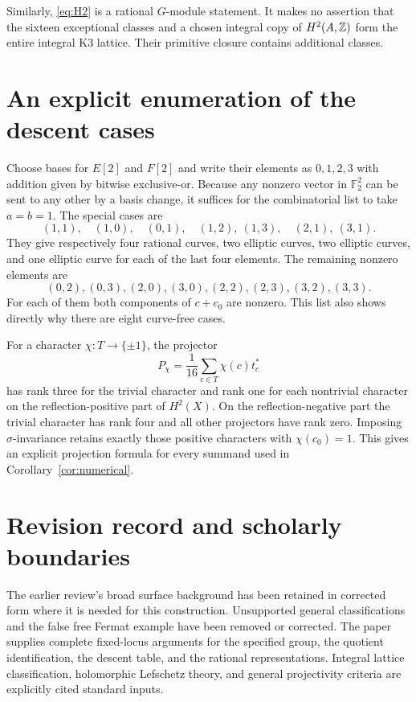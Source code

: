 \documentclass[11pt]{amsart}
\theoremstyle{definition}
\newcommand{\F}{\mathbb F}\newcommand{\Km}{\operatorname{Km}}
\begin{document}
Similarly, \eqref{eq:H2} is a rational $G$-module statement. It makes
no assertion that the sixteen exceptional classes and a chosen
integral copy of $H^2(A,\mathbb Z)$ form the entire integral K3 lattice.
Their primitive closure contains additional classes.

\section{An explicit enumeration of the descent cases}
Choose bases for $E[2]$ and $F[2]$ and write their elements as
$0,1,2,3$ with addition given by bitwise exclusive-or. Because any
nonzero vector in $\F_2^2$ can be sent to any other by a basis
change, it suffices for the combinatorial list to take $a=b=1$.
The special cases are
\[
 (1,1),\quad(1,0),\quad(0,1),\quad(1,2),\ (1,3),\quad
 (2,1),\ (3,1).
\]
They give respectively four rational curves, two elliptic curves,
two elliptic curves, and one elliptic curve for each of the last
four elements. The remaining nonzero elements are
\[
 (0,2),(0,3),(2,0),(3,0),(2,2),(2,3),(3,2),(3,3).
\]
For each of them both components of $c+c_0$ are nonzero. This list
also shows directly why there are eight curve-free cases.

For a character $\chi:T\to\{\pm1\}$, the projector
\[
 P_\chi=\frac1{16}\sum_{c\in T}\chi(c)t_c^*
\]
has rank three for the trivial character and rank one for each
nontrivial character on the reflection-positive part of $H^2(X)$.
On the reflection-negative part the trivial character has rank four
and all other projectors have rank zero. Imposing $\sigma$-invariance
retains exactly those positive characters with $\chi(c_0)=1$.
This gives an explicit projection formula for every summand used
in Corollary~\ref{cor:numerical}.

\section{Revision record and scholarly boundaries}
The earlier review's broad surface background has been retained in
corrected form where it is needed for this construction. Unsupported
general classifications and the false free Fermat example have been
removed or corrected. The paper supplies complete fixed-locus
arguments for the specified group, the quotient identification, the
descent table, and the rational representations. Integral lattice
classification, holomorphic Lefschetz theory, and general projectivity
criteria are explicitly cited standard inputs.
\end{document}
